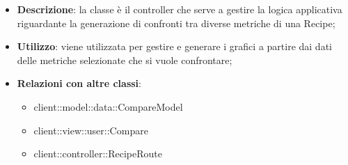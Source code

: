 			\begin{itemize}
				\item \textbf{Descrizione}: la classe è il controller che serve a gestire la logica applicativa riguardante la generazione di confronti tra diverse metriche di una Recipe;
				\item \textbf{Utilizzo}: viene utilizzata per gestire e generare i grafici a partire dai dati delle metriche selezionate che si vuole confrontare;
				\item \textbf{Relazioni con altre classi}:
					\begin{itemize}
						\item client::model::data::CompareModel
						\item client::view::user::Compare
						\item client::controller::RecipeRoute
					\end{itemize}


\end{itemize}
